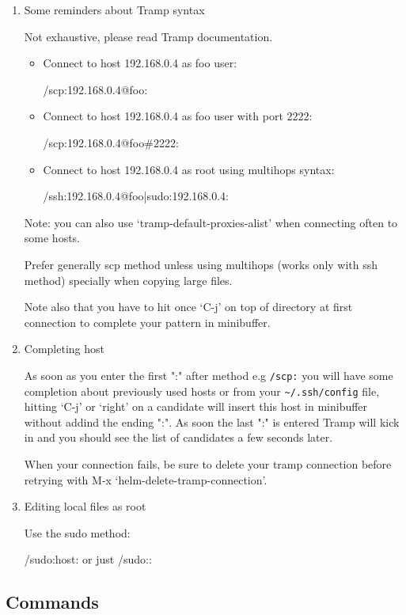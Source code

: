 \documentclass[11pt]{article}
\begin{document}
\begin{enumerate}
\item Some reminders about Tramp syntax
\label{sec:orge70a9b9}

Not exhaustive, please read Tramp documentation.

\begin{itemize}
\item Connect to host 192.168.0.4 as foo user:

/scp:192.168.0.4@foo:

\item Connect to host 192.168.0.4 as foo user with port 2222:

/scp:192.168.0.4@foo\#2222:

\item Connect to host 192.168.0.4 as root using multihops syntax:

/ssh:192.168.0.4@foo|sudo:192.168.0.4:
\end{itemize}

Note: you can also use ‘tramp-default-proxies-alist’ when connecting often to
some hosts.

Prefer generally scp method unless using multihops (works only with ssh method)
specially when copying large files.

Note also that you have to hit once ‘C-j’ on top of directory at first connection
to complete your pattern in minibuffer.

\item Completing host
\label{sec:org71667e9}

As soon as you enter the first ":" after method e.g \texttt{/scp:} you will
have some completion about previously used hosts or from your \texttt{\textasciitilde{}/.ssh/config}
file, hitting ‘C-j’ or ‘right’ on a candidate will insert this host in minibuffer
without addind the ending ":".
As soon the last ":" is entered Tramp will kick in and you should see the list
of candidates a few seconds later.

When your connection fails, be sure to delete your tramp connection before retrying
with M-x ‘helm-delete-tramp-connection’.

\item Editing local files as root
\label{sec:org50f4c32}

Use the sudo method:

/sudo:host: or just /sudo::
\end{enumerate}

\subsection{Commands}
\label{sec:org21d7703}
\end{document}

